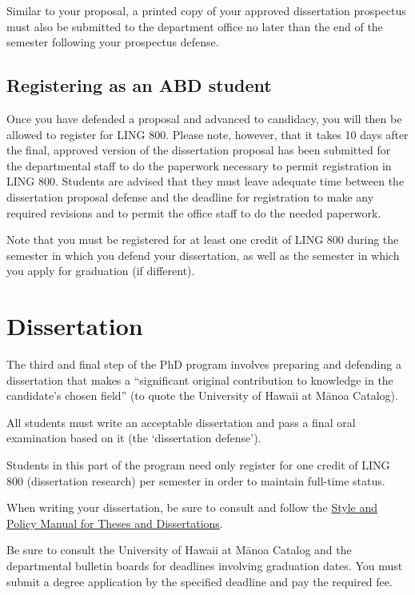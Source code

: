 \documentclass[
]{book}
\begin{document}
Similar to your proposal, a printed copy of your approved dissertation prospectus must also be submitted to the department office no later than the end of the semester following your prospectus defense.

\section{Registering as an ABD student}\label{registering-as-an-abd-student}

Once you have defended a proposal and advanced to candidacy, you will then be allowed to register for LING 800. Please note, however, that it takes 10 days after the final, approved version of the dissertation proposal has been submitted for the departmental staff to do the paperwork necessary to permit registration in LING 800. Students are advised that they must leave adequate time between the dissertation proposal defense and the deadline for registration to make any required revisions and to permit the office staff to do the needed paperwork.

Note that you must be registered for at least one credit of LING 800 during the semester in which you defend your dissertation, as well as the semester in which you apply for graduation (if different).

\chapter{Dissertation}\label{dissertation}

The third and final step of the PhD program involves preparing and defending a dissertation that makes a ``significant original contribution to knowledge in the candidate's chosen field'' (to quote the University of Hawai\textquotesingle i at Mānoa Catalog).

All students must write an acceptable dissertation and pass a final oral examination based on it (the `dissertation defense').

Students in this part of the program need only register for one credit of LING 800 (dissertation research) per semester in order to maintain full-time status.

When writing your dissertation, be sure to consult and follow the \href{http://manoa.hawaii.edu/graduate/sites/manoa.hawaii.edu.graduate/files/documents/misc/tdstylepolicy_e.pdf}{Style and Policy Manual for Theses and Dissertations}.

Be sure to consult the University of Hawai\textquotesingle i at Mānoa Catalog and the departmental bulletin boards for deadlines involving graduation dates. You must submit a degree application by the specified deadline and pay the required fee.
\end{document}
